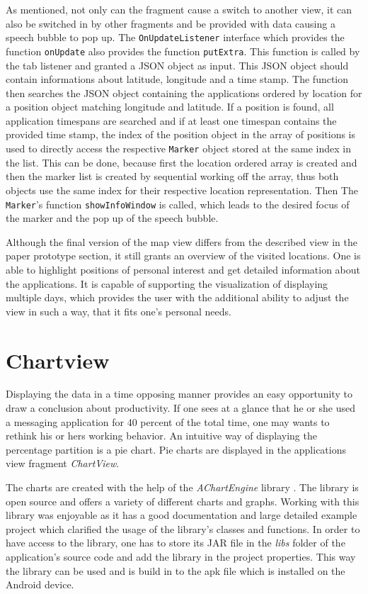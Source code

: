 As mentioned, not  only can the fragment cause a switch to another view, it can also be switched in by other fragments and be provided with data causing a speech bubble to pop up. The \lstinline$OnUpdateListener$ interface which provides the function \lstinline$onUpdate$ also provides the function \lstinline$putExtra$. This function is called by the tab listener and granted a JSON object as input. This JSON object should contain informations about latitude, longitude and a time stamp. The function then searches the JSON object containing the applications ordered by location for a position object matching longitude and latitude. If a position is found, all application timespans are searched and if at least one timespan contains the provided time stamp, the index of the position object in the array of positions is used to directly access the respective \lstinline$Marker$ object stored at the same index in the list. This can be done, because first the location ordered array is created and then the marker list is created by sequential working off the array, thus both objects use the same index for their respective location representation. Then The \lstinline$Marker$'s function \lstinline$showInfoWindow$ is called, which leads to the desired focus of the marker and the pop up of the speech bubble.

Although the final version of the map view differs from the described view in the paper prototype section, it still grants an overview of the visited locations. One is able to highlight positions of personal interest and get detailed information about the applications. It is capable of supporting the visualization of displaying multiple days, which provides the user with the additional ability to adjust the view in such a way, that it fits one's personal needs.

\newpage
\section{Chartview}
Displaying the data in a time opposing manner provides an easy opportunity to draw a conclusion about productivity. If one sees at a glance that he or she used a messaging application for 40 percent of the total time, one may wants to rethink his or hers working behavior. An intuitive way of displaying the percentage partition is a pie chart. Pie charts are displayed in the applications view fragment \emph{ChartView}.

The  charts are created with the help of the \emph{AChartEngine} library \cite{achartengine}. The library is open source and offers a variety of different charts and graphs. Working with this library was enjoyable as it has a good documentation and large detailed example project which clarified the usage of the library's classes and functions. In order to have access to the library, one has to store its JAR file in the \emph{libs} folder of the application's source code and add the library in the project properties. This way the library can be used and is build in to the apk file which is installed on the Android device.

